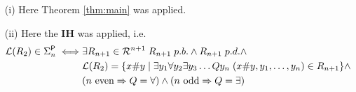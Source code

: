 \documentclass [11pt]{article}
\newcommand{\ccfont}[1]{\protect\mathsf{#1}}
\newcommand{\Ptime}{\ccfont{P}}
\newcommand{\phs}[1]{\Sigma_{#1}^{\Ptime}}
\newcommand{\sto}{\Rightarrow}
\begin{document}
\begin{enumerate}
\item[(i)] Here Theorem \ref{thm:main} was applied.
\item[(ii)] Here the \textbf{IH} was applied, i.e. 
\begin{equation*}
\begin{split}
\mathcal{L}(R_2) \in \phs{n} \iff& \exists R_{n+1}  \in  \mathcal{R}^{n+1} \; R_{n+1} \; p.b. \land R_{n+1} \; p.d. \land  \\
&\mathcal{L}(R_2) = \{x\#y \mid \exists y_1 \forall y_2\exists y_3\dots Q y_n  \; (x\#y,y_1,\ldots,y_n) \in R_{n+1}\} \land  \\
 & (n \text{ even}  \sto Q=\forall) \land (n \text{ odd}  \sto Q=\exists )
\end{split}
\end{equation*}



\end{enumerate}
\end{document}
